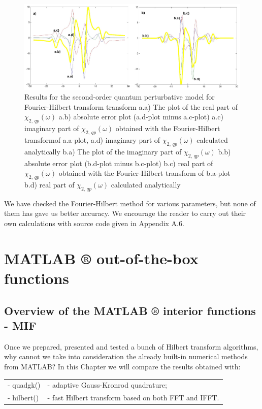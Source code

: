 \documentclass[12pt,twoside,a4paper]{article}
\numberwithin{equation}{subsection}
\numberwithin{figure}{subsection}
\begin{document}
\begin{figure} 
  \includegraphics[width=150mm]{img/four_qp2.png}
  \caption{Results for the second-order quantum perturbative model for Fourier-Hilbert transform transform
     a.a) The plot of the real part of ${\chi_{2, \,qp}}(\omega )$
     a.b) absolute error plot (a.d-plot minus a.c-plot)
     a.c) imaginary part of $\chi_{2, \, qp} (\omega )$ obtained with the Fourier-Hilbert transformof a.a-plot, 
     a.d) imaginary part of $\chi_{2, \, qp} (\omega )$ calculated analytically 
     b.a) The plot of the imaginary part of ${\chi_{2, \, qp}}(\omega )$ 
     b.b) absolute error plot (b.d-plot minus b.c-plot)
     b.c) real part of $\chi_{2, \, qp} (\omega )$ obtained with the Fourier-Hilbert transform of b.a-plot 
     b.d) real part of $\chi_{2, \, qp} (\omega )$ calculated analytically 
     \label{fig:four_qp2}
     }
\end{figure} 

We have checked the Fourier-Hilbert method for various parameters, but none of them has gave us better accuracy. We encourage the reader to carry out their own calculations with source code given in Appendix A.6.

\section{MATLAB ® out-of-the-box functions} \label{chap:matlab}

\subsection{Overview of the MATLAB ® interior functions - MIF} \label{chap:matlab_overview}


Once we prepared, presented and tested a bunch of Hilbert transform algorithms, why cannot we take into consideration the already built-in numerical methods from MATLAB? In this Chapter we will compare the results obtained with: 


\begin{tabular}{l l}
  - quadgk() &- adaptive Gauss-Kronrod quadrature; \\
  - hilbert() &- fast Hilbert transform based on both FFT and IFFT. \\
\end{tabular}
\end{document}
